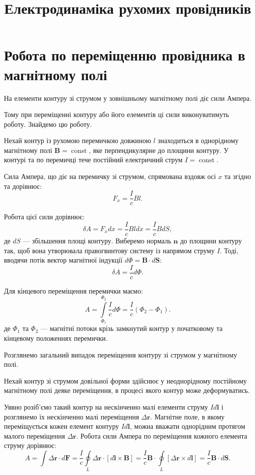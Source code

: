 \documentclass[]{article}
\title{Електродинаміка рухомих провідників}
\author{}
\date{}
\newcommand{\vect}[1]{\symbf{#1}}
\def\Bfield{\vect{B}}          %
\DeclareMathOperator{\const}{const}
\begin{document}
\maketitle

\section{Робота по переміщенню провідника в магнітному полі}

На елементи контуру зі струмом у зовнішньому магнітному полі діє сили Ампера.

Тому при переміщенні контуру або його елементів ці сили виконуватимуть роботу. Знайдемо цю роботу.

Нехай контур із рухомою перемичкою довжиною $ l $ знаходиться в однорідному магнітному полі $ \Bfield = \const $, яке перпендикулярне до площини контуру. У
контурі та по перемичці тече постійний електричний струм $ I = \const $.

Сила Ампера, що діє на перемичку зі струмом, спрямована вздовж осі $ x $ та згідно та дорівнює:
\begin{equation*}
    F_x = \frac{I}{c} B l.
\end{equation*}

Робота цієї сили дорівнює:
\begin{equation*}
    \delta A = F_x dx = \frac{I}{c} B l dx = \frac{I}{c} B dS,
\end{equation*}
де $ dS $ --- збільшення площі контуру. Виберемо нормаль $ \vect{n} $
до площини контуру так, щоб вона утворювала правогвинтову систему із напрямом струму $ I $. Тоді, вводячи потік вектор магнітної індукції $ d\Phi = \Bfield\cdot d\vect{S} $:
\begin{equation*}
    \delta A = \frac{I}{c} d\Phi.
\end{equation*}

Для кінцевого переміщення перемички маємо:
\begin{equation*}
    A = \int\limits_{\Phi_1}^{\Phi_2} \frac{I}{c} d\Phi = \frac{I}{c} (\Phi_2 - \Phi_1).
\end{equation*}
де $ \Phi_1 $ та $ \Phi_2 $ --- магнітні потоки крізь замкнутий контур у початковому та кінцевому положеннях перемички.

Розглянемо загальний випадок переміщення контуру зі струмом у магнітному полі.

Нехай контур зі струмом довільної форми здійснює у неоднорідному постійному магнітному полі деяке переміщення, в процесі якого контур може деформуватись.

Уявно розіб'ємо такий контур на нескінченно малі елементи струму $ Id\vect{l} $ і розглянемо їх нескінченно малі переміщення $ \Delta\vect{r} $. Магнітне поле, в якому переміщується кожен елемент контуру $ Id\vect{l} $, можна вважати однорідним протягом малого переміщення $ \Delta\vect{r} $. Робота сили Ампера по переміщення кожного елемента струму дорівнює:
\begin{equation*}
    A =  \int \Delta\vect{r}  \cdot d\vect{F} =  \frac{I}{c}   \oint\limits_L \Delta\vect{r} \cdot [d\vect{l}\times\Bfield] =  \frac{I}{c} \Bfield \cdot \oint\limits_L  [\Delta\vect{r} \times d\vect{l}] = \frac{I}{c} \Bfield \cdot d\vect{S}.
\end{equation*}
\end{document}
